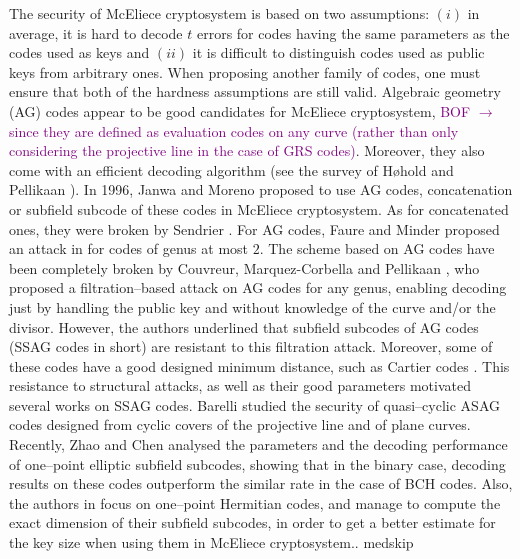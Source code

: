 \documentclass[a4paper]{amsart}
\theoremstyle{definition}
\theoremstyle{remark}
\newcommand\jade[1]{\textcolor{purple}{#1}}
\begin{document}
The security of McEliece cryptosystem is based on two assumptions: $(i)$ in average, it is hard to decode $t$ errors for codes having the same parameters as the codes used as keys and $(ii)$ it is difficult to distinguish codes used as public keys from arbitrary ones. When proposing another family of codes, one must ensure that both of the hardness assumptions are still valid.
Algebraic geometry (AG) codes appear to be good candidates for McEliece cryptosystem, \jade{BOF $\rightarrow$ since they are defined as evaluation codes on any curve (rather than only considering the projective line in the case of GRS codes)}. Moreover, they also come with an efficient decoding algorithm (see the survey of H\o hold and Pellikaan \cite{HP95}).
In 1996, Janwa and Moreno \cite{JM96} proposed to use AG codes, concatenation or subfield subcode of these codes in McEliece cryptosystem. As for concatenated ones, they were broken by Sendrier \cite{Sen94}. For AG codes, Faure and Minder proposed an attack in \cite{FM08,Min07,Fau09} for codes of genus at most $2$. The scheme based on AG codes have been completely broken by Couvreur, Marquez-Corbella and Pellikaan \cite{CMR17}, who proposed a filtration--based attack on AG codes for any genus, enabling decoding just by handling the public key and without knowledge of the curve and/or the divisor. However, the authors underlined that subfield subcodes of AG codes (SSAG codes in short) are resistant to this filtration attack. Moreover, some of these codes have a good designed minimum distance, such as Cartier codes \cite{Cou14}. This resistance to structural attacks, as well as their good parameters motivated several works on SSAG codes. Barelli \cite{B18} studied the security of quasi--cyclic ASAG codes designed from cyclic covers of the projective line and of plane curves. Recently, Zhao and Chen \cite{ZC22} analysed the parameters and the decoding performance of one--point elliptic subfield subcodes, showing that in the binary case, decoding results on these codes outperform the similar rate in the case of BCH codes. Also, the authors in \cite{PJ14,EKN21} focus on one--point Hermitian codes, and manage to compute the exact dimension of their subfield subcodes, in order to get a better estimate for the key size when using them in McEliece cryptosystem..               medskip
\end{document}
